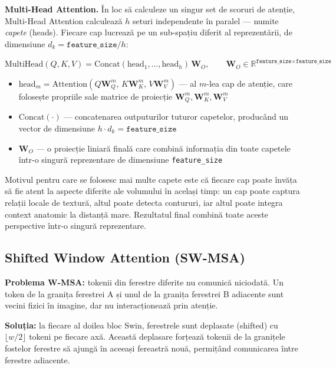 \documentclass[12pt, a4paper]{report}
\newcommand{\formula}[1]{%
    \begin{center}
        \colorbox{codebackground}{%
            \parbox{0.88\textwidth}{\centering\vspace{4pt}$#1$\vspace{4pt}}%
        }
    \end{center}
}
\begin{document}
\textbf{Multi-Head Attention.}
În loc să calculeze un singur set de scoruri de atenție,
Multi-Head Attention calculează $h$ seturi independente în paralel
— numite \textit{capete} (heads). Fiecare cap lucrează pe un
sub-spațiu diferit al reprezentării, de dimensiune
$d_k = \texttt{feature\_size} / h$:

\formula{
    \text{MultiHead}(Q,K,V) =
    \text{Concat}(\text{head}_1, \ldots, \text{head}_h)\,\mathbf{W}_O,
    \qquad \mathbf{W}_O \in \mathbb{R}^{\texttt{feature\_size}
    \times \texttt{feature\_size}}
}

\begin{itemize}
    \item $\text{head}_m = \text{Attention}(Q\mathbf{W}_Q^m,\,
    K\mathbf{W}_K^m,\, V\mathbf{W}_V^m)$ --- al $m$-lea cap de
    atenție, care folosește propriile sale matrice de proiecție
    $\mathbf{W}_Q^m, \mathbf{W}_K^m, \mathbf{W}_V^m$
    \item $\text{Concat}(\cdot)$ --- concatenarea outputurilor
    tuturor capetelor, producând un vector de dimensiune
    $h \cdot d_k = \texttt{feature\_size}$
    \item $\mathbf{W}_O$ --- o proiecție liniară finală care
    combină informația din toate capetele într-o singură
    reprezentare de dimensiune \texttt{feature\_size}
\end{itemize}

Motivul pentru care se folosesc mai multe capete este că fiecare
cap poate învăța să fie atent la aspecte diferite ale volumului
în același timp: un cap poate captura relații locale de textură,
altul poate detecta contururi, iar altul poate integra context
anatomic la distanță mare. Rezultatul final combină toate aceste
perspective într-o singură reprezentare.


\subsection{Shifted Window Attention (SW-MSA)}

\textbf{Problema W-MSA:} tokenii din ferestre diferite nu comunică niciodată.
Un token de la granița ferestrei A și unul de la granița ferestrei B adiacente
sunt vecini fizici în imagine, dar nu interacționează prin atenție.

\textbf{Soluția:} la fiecare al doilea bloc Swin, ferestrele sunt deplasate
(shifted) cu $\lfloor w/2 \rfloor$ tokeni pe fiecare axă. Această deplasare
forțează tokenii de la granițele fostelor ferestre să ajungă în aceeași fereastră
nouă, permițând comunicarea între ferestre adiacente.
\end{document}
